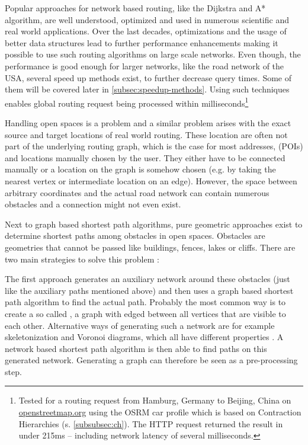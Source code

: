 	Popular approaches for network based routing, like the Dijkstra and A* algorithm, are well understood, optimized and used in numerous scientific and real world applications.
	Over the last decades, optimizations and the usage of better data structures lead to further performance enhancements making it possible to use such routing algorithms on large scale networks.
	Even though, the performance is good enough for larger networks, like the road network of the USA\cite{aviram-optimizing-dijkstra}, several speed up methods exist, to further decrease query times.
	Some of them will be covered later in \cref{subsec:speedup-methods}.
	Using such techniques enables global routing request being processed within milliseconds\footnote{Tested for a routing request from Hamburg, Germany to Beijing, China on \href{https://www.openstreetmap.org/directions?engine=fossgis\_osrm\_car&route=53.55\%2C10.00\%3B39.91\%2C116.39}{openstreetmap.org} using the OSRM car profile which is based on Contraction Hierarchies (s. \cref{subsubsec:ch}). The HTTP request returned the result in under 215ms -- including network latency of several milliseconds.}
	
	Handling open spaces is a problem and a similar problem arises with the exact source and target locations of real world routing.
	These location are often not part of the underlying routing graph, which is the case for most addresses,  (POIs) and locations manually chosen by the user.
	They either have to be connected manually or a location on the graph is somehow chosen (e.g. by taking the nearest vertex or intermediate location on an edge).
	However, the space between arbitrary coordinates and the actual road network can contain numerous obstacles and a connection might not even exist.
	
	Next to graph based shortest path algorithms, pure geometric approaches exist to determine shortest paths among obstacles in open spaces.
	Obstacles are geometries that cannot be passed like buildings, fences, lakes or cliffs.
	There are two main strategies to solve this problem \cite{hershberger-suri}:
	
	The first approach generates an auxiliary network around these obstacles (just like the auxiliary paths mentioned above) and then uses a graph based shortest path algorithm to find the actual path.
	Probably the most common way is to create a so called , a graph with edged between all vertices that are visible to each other.
	Alternative ways of generating such a network are for example skeletonization and Voronoi diagrams, which all have different properties \cite{graser-osm-open-spaces}.
	A network based shortest path algorithm is then able to find paths on this generated network\cite{hershberger-suri}.
	Generating a graph can therefore be seen as a pre-processing step.
	

